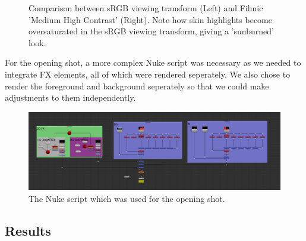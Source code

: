 \documentclass[11pt]{article}
\begin{document}
\begin{figure}[htbp]
\caption{\label{figure:filmic} Comparison between sRGB viewing transform (Left) and Filmic 'Medium High Contrast' (Right). Note how skin highlights become oversaturated in the sRGB viewing transform, giving a 'sunburned' look.}
\end{figure}

For the opening shot, a more complex Nuke script was necessary as we needed to integrate FX elements, all of which were rendered seperately. We also chose to render the foreground and background seperately so that we could make adjustments to them independently.
\begin{figure}[htbp]\centering
	\includegraphics[width=1.0\linewidth]{images/shot010comp.png}
	\caption{\label{figure:shot010comp} The Nuke script which was used for the opening shot.}
\end{figure}


\subsection{Results}

\end{document}
